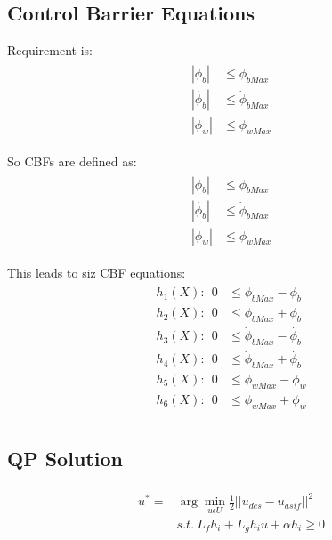 \documentclass[journal, onecolumn]{IEEEtran} %
\begin{document}
\subsection{Control Barrier Equations}

Requirement is:
\begin{eqnarray}
    \begin{aligned}
        |\phi_b| &\leq \phi_{bMax} \\
        |\dot{\phi_b}| &\leq \dot{\phi}_{bMax} \\
        |\phi_w| &\leq \phi_{wMax}
    \end{aligned}
\end{eqnarray}

So CBFs are defined as:
\begin{eqnarray}
    \begin{aligned}
        |\phi_b| &\leq \phi_{bMax} \\
        |\dot{\phi_b}| &\leq \dot{\phi}_{bMax} \\
        |\phi_w| &\leq \phi_{wMax}
    \end{aligned}
\end{eqnarray}

This leads to siz CBF equations:
\begin{eqnarray}
    \begin{aligned}
        h_1(X):\ \ 0 &\leq \phi_{bMax} - \phi_b \\
        h_2(X):\ \ 0 &\leq \phi_{bMax} + \phi_b \\
        h_3(X):\ \ 0 &\leq \dot{\phi}_{bMax} - \dot{\phi_b}\\
        h_4(X):\ \ 0 &\leq \dot{\phi}_{bMax} + \dot{\phi_b}\\
        h_5(X):\ \ 0 &\leq \phi_{wMax} - \phi_w \\
        h_6(X):\ \ 0 &\leq \phi_{wMax} + \phi_w \\
    \end{aligned}
\end{eqnarray}

\subsection{QP Solution}

\begin{eqnarray}
    \begin{aligned}
        u^* =& \arg\min_{u \epsilon U} \frac{1}{2}||u_{des} - u_{asif} ||^2 \\
        &s.t. \ L_fh_i + L_g h_i u + \alpha h_i \geq 0
    \end{aligned}
\end{eqnarray}
\end{document}
